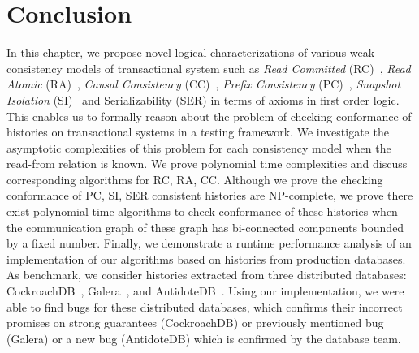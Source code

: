 \section{Conclusion}
\label{sec:txn:conclusion}

In this chapter, we propose novel logical characterizations of various weak consistency models of transactional system such as \emph{Read Committed} (RC)~\cite{DBLP:conf/sigmod/BerensonBGMOO95}, \emph{Read Atomic} (RA)~\cite{DBLP:conf/concur/Cerone0G15},  \emph{Causal Consistency} (CC)~\cite{DBLP:journals/cacm/Lamport78}, \emph{Prefix Consistency} (PC)~\cite{DBLP:conf/ecoop/BurckhardtLPF15}, \emph{Snapshot Isolation} (SI)~\cite{DBLP:conf/sigmod/BerensonBGMOO95} and Serializability (SER) in terms of axioms in first order logic. This enables us to formally reason about the problem of checking conformance of histories on transactional systems in a testing framework. We investigate the asymptotic complexities of this problem for each consistency model when the read-from relation is known. We prove polynomial time complexities and discuss corresponding algorithms for RC, RA, CC. Although we prove the checking conformance of PC, SI, SER consistent histories are NP-complete, we prove there exist polynomial time algorithms to check conformance of these histories when the communication graph of these graph has bi-connected components bounded by a fixed number. Finally, we demonstrate a runtime performance analysis of an implementation of our algorithms based on histories from production databases. As benchmark, we consider histories extracted from three distributed databases: CockroachDB~\cite{cockroach}, Galera~\cite{galera}, and AntidoteDB~\cite{antidote}. Using our implementation, we were able to find bugs for these distributed databases, which confirms their incorrect promises on strong guarantees (CockroachDB) or previously mentioned bug (Galera) or a new bug (AntidoteDB) which is confirmed by the database team.